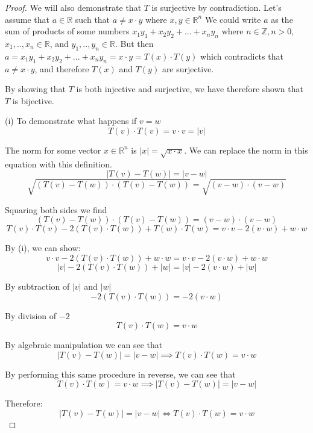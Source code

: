 \documentclass[a4paper]{article}
\begin{document}
\begin{myparindent}{0pt}
\begin{proof}
  We will also demonstrate that $T$ is surjective by contradiction. Let's assume
  that $a \in \mathbb{R}$ such that $a \neq x \cdot y$ where
  $x, y \in \mathbb{R}^n$ We could write $a$ as the sum of products of some numbers
  $x_1y_1 + x_2y_2 + ... + x_ny_n$ where $n \in \mathbb{Z}, n > 0$,
  $x_1, .., x_n \in \mathbb{R}$, and $y_1, .., y_n \in \mathbb{R}$.
  But then $a = x_1y_1 + x_2y_2 + ... + x_ny_n = x \cdot y = T(x) \cdot T(y)$
  which contradicts that $a \neq x \cdot y$, and therefore $T(x)$ and $T(y)$
  are surjective. \newline

  By showing that $T$ is both injective and surjective, we have therefore shown
  that $T$ is bijective. \newline

  (i) To demonstrate what happens if $v = w$
  \[ T(v) \cdot T(v) = v \cdot v = |v| \]

  The norm for some vector $x \in \mathbb{R}^n$ is $|x| = \sqrt{x \cdot x}$.
  We can replace the norm in this equation with this definition.
  \[ |T(v) - T(w)| = |v - w| \]
  \[ \sqrt{(T(v) - T(w)) \cdot (T(v) - T(w))} = \sqrt{(v - w) \cdot (v - w)} \]

  Squaring both sides we find
  \[ (T(v) - T(w)) \cdot (T(v) - T(w)) = (v - w) \cdot (v - w) \]
  \[ T(v) \cdot T(v) - 2(T(v) \cdot T(w)) + T(w) \cdot T(w) = v \cdot v - 2(v \cdot w) + w \cdot w \]

  By (i), we can show:
  \[ v \cdot v - 2(T(v) \cdot T(w)) + w \cdot w = v \cdot v - 2(v \cdot w) + w \cdot w \]
  \[ |v| - 2(T(v) \cdot T(w)) + |w| = |v| - 2(v \cdot w) + |w| \]

  By subtraction of $|v|$ and $|w|$
  \[ - 2(T(v) \cdot T(w)) = - 2(v \cdot w) \]

  By division of $-2$
  \[ T(v) \cdot T(w) = v \cdot w \]

  By algebraic manipulation we can see that
  \[ |T(v) - T(w)| = |v - w| \implies T(v) \cdot T(w) = v \cdot w \]

  By performing this same procedure in reverse, we can see that
  \[ T(v) \cdot T(w) = v \cdot w \implies |T(v) - T(w)| = |v - w| \]

  Therefore:
  \[ |T(v) - T(w)| = |v - w| \iff T(v) \cdot T(w) = v \cdot w \]


\end{proof}

\end{myparindent}
\end{document}
